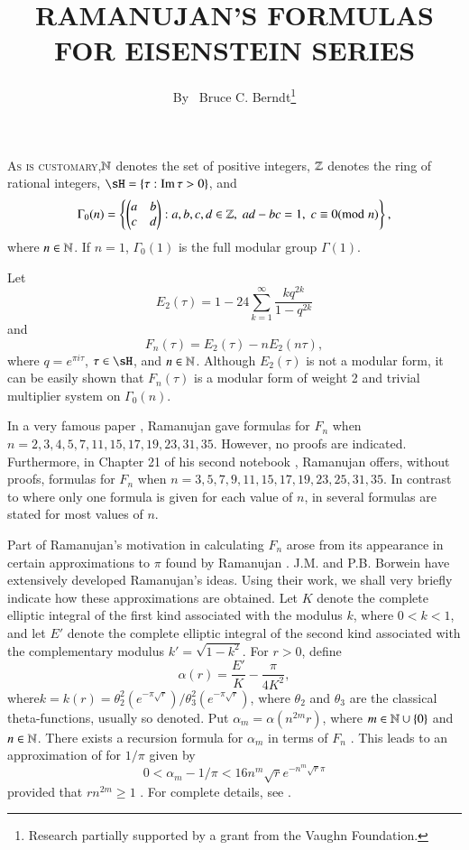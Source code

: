 
\title{RAMANUJAN'S FORMULAS FOR EISENSTEIN SERIES}

\author{By~  Bruce C. Berndt\footnote{Research partially supported by a grant from the Vaughn Foundation.}}

\date{}
\maketitle

\setcounter{pageoriginal}{22} 

\noindent
\textsc{As is customary},\pageoriginale $\mathbb{N}$ denotes the set of positive integers, $\mathbb{Z}$ denotes the ring of rational integers, $\sH= \left\{\tau : \Iim \tau > 0 \right\}$, and 
$$
\Gamma_0 (n) = 
\left\{
\begin{pmatrix}
a & b\\
c & d
\end{pmatrix}:
 a, b, c, d \in \mathbb{Z}, \; ad - bc = 1, \; c \equiv 0 ({\rm{mod}}\kern.3em n)
\right\},
$$ 
where $n \in \mathbb{N}$. If $n=1$, $\Gamma_0 (1)$ is the full modular group $\Gamma (1)$. 

Let
$$
E_2 (\tau ) =1 -24 \sum\limits^\infty_{k=1} \frac{kq^{2k}}{1-q^{2k}} 
$$
and 
$$
F_n(\tau) = E_2 (\tau)  -n E_2 (n \tau), 
$$
where $q =e^{\pi i \tau}$, $\tau \in \sH$, and $n \in \mathbb{N}$. Although $E_2 (\tau)$ is not a modular form, it can be easily shown that $F_n (\tau)$ is a modular form of weight 2 and trivial multiplier system on $\Gamma_0(n)$. 

In a very famous paper \cite[pp. 23-39]{art3-key8}, Ramanujan gave formulas for $F_n$ when $n = 2, 3,4,5,7,11,15,17,19,23,31,35$. However, no proofs are indicated. Furthermore, in Chapter 21 of his second notebook \cite{art3-key9}, Ramanujan offers, without proofs, formulas for $F_n$ when $n = 3,5,7,9,11, 15, 17, 19, 23, 25, 31, 35$. In contrast to \cite{art3-key8} where only one formula is given for each value of $n$, in \cite{art3-key9} several formulas are stated for most values of $n$.

Part of Ramanujan's motivation in calculating $F_n$ arose from its appearance in certain approximations to $\pi$ found by Ramanujan \cite{art3-key8}. J.M. and P.B. Borwein \cite{art3-key6} have extensively developed Ramanujan's ideas. Using their work, we shall very briefly indicate how these approximations are obtained. Let $K$ denote the complete elliptic integral of the first kind associated with the modulus  $k$, where $0< k <1$, and let $E'$ denote the complete elliptic integral of the second kind associated with the complementary modulus $k' = \sqrt{1-k^2}$. For $r>0$, define
$$
\alpha (r) = \frac{E'}{K} - \frac{\pi}{4K^2},
$$
where\pageoriginale $k = k(r) = \theta^2_2 (e^{-\pi\sqrt{r}})/\theta^2_3(e^{-\pi\sqrt{r}})$, where $\theta_2$ and $\theta_3$ are the classical theta-functions, usually so denoted. Put $\alpha_m= \alpha (n^{2m}r)$, where $m \in \mathbb{N} \cup \{0\}$ and $n \in \mathbb{N}$. There exists a recursion formula for $\alpha_m$ in terms of $F_n$ \cite[p. 158]{art3-key6}. This leads to an approximation of for $1/\pi$ given by
$$
0 < \alpha_m -1/\pi < 16n^m \sqrt{r} e^{-n^m\sqrt{r} \pi}
$$
provided that $rn^{2m} \geqslant 1$ \cite[p. 169]{art3-key6}. For complete details, see \cite{art3-key6}.

